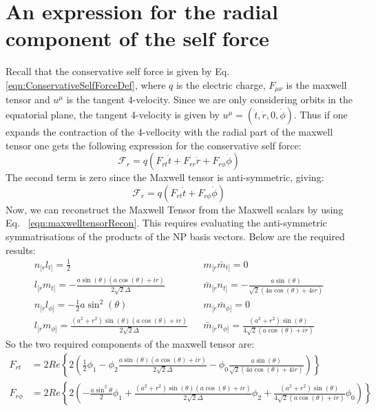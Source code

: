 \documentclass[preprint,showpacs,preprintnumbers,amssymb,superscriptaddress,aps,prd,nofootinbib,11pt]{revtex4-1}
\begin{document}
\section{An expression for the radial component of the self force}
Recall that the conservative self force is given by Eq. \eqref{eqn:ConservativeSelfForceDef}, where $q$ is the electric charge, $F_{\mu\nu}$ is the maxwell tensor and $u^\mu$ is the tangent 4-velocity. Since we are only considering orbits in the equatorial plane, the tangent 4-velocity is given by $u^\mu = (\dot{t}, \dot{r}, 0 , \dot{\phi})$. Thus if one expands the contraction of the 4-vellocity with the radial part of the  maxwell tensor one gets the following expression for the conservative self force:
\begin{equation}
    \mathcal{F}_r = q (F_{rt} \dot{t} + F_{rr} \dot{r} + F_{r\phi} \dot{\phi})
\end{equation}
The second term is zero since the Maxwell tensor is anti-symmetric, giving:
\begin{equation}
    \mathcal{F}_r = q (F_{rt} \dot{t} + F_{r\phi} \dot{\phi})
\end{equation}
Now, we can reconstruct the Maxwell Tensor from the Maxwell scalars by using Eq.~ \eqref{eqn:maxwelltensorRecon}. This requires evaluating the anti-symmetric symmatrisations of the products of the NP basis vectors. Below are the required results:
\begin{align}
    n_{[r}l_{t]} = \frac{1}{2}&&m_{[r}\bar{m}_{t]} = 0\\
    l_{[r}m_{t]} = -\frac{a \sin (\theta ) (a \cos (\theta )+i r)}{2 \sqrt{2}\Delta} && \bar{m}_{[r}n_{t]} = -\frac{a \sin (\theta )}{\sqrt{2} (4 a \cos (\theta )+4 i r)}\\
    n_{[r}l_{\phi ]} = -\frac{1}{2} a \sin ^2(\theta ) && m_{[r} \bar{m}_{\phi]} = 0 \\
    l_{[r}m_{\phi]}= \frac{\left(a^2+r^2\right) \sin (\theta ) (a \cos (\theta )+i r)}{2 \sqrt{2} \Delta} && \bar{m}_{[r}n_{\phi ]} = \frac{\left(a^2+r^2\right) \sin (\theta )}{4 \sqrt{2} (a \cos (\theta )+i r)}
\end{align}
So the two required components of the maxwell tensor are:
\begin{align}
    F_{rt} &=2Re \left\{ 2 \left( \frac{1}{2}\phi_1 - \phi_2  \frac{a \sin (\theta ) (a \cos (\theta )+i r)}{2 \sqrt{2}\Delta} - \phi_0 \frac{a \sin (\theta )}{\sqrt{2} (4 a \cos (\theta )+4 i r)}\right)\right \} \label{eqn:Frt1}\\
    F_{r\phi} &=2 Re\left\{2 \left( - \frac{a \sin^2\theta}{2} \phi_1 +\frac{\left(a^2+r^2\right) \sin (\theta ) (a \cos (\theta )+i r)}{2 \sqrt{2} \Delta} \phi_2  +  \frac{\left(a^2+r^2\right) \sin (\theta )}{4 \sqrt{2} (a \cos (\theta )+i r)} \phi_0\right)\right\}\label{eqn:Frphi1}
\end{align}
\end{document}
